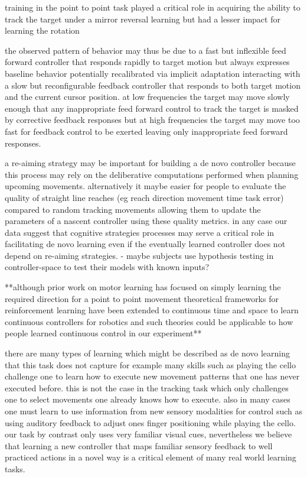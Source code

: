 \documentclass[../main.tex]{subfiles}
\begin{document}
{{training in the point to point task played a critical role in acquiring the ability to track the target under a mirror reversal learning but had a lesser impact for learning the rotation

the observed pattern of behavior may thus be due to a fast but inflexible feed forward controller that responds rapidly to target motion but always expresses baseline behavior potentially recalibrated via implicit adaptation interacting with a slow but reconfigurable feedback controller that responds to both target motion and the current cursor position. at low frequencies the target may move slowly enough that any inappropriate feed forward control to track the target is masked by corrective feedback responses but at high frequencies the target may move too fast for feedback control to be exerted leaving only inappropriate feed forward responses.

a re-aiming strategy may be important for building a de novo controller because this process may rely on the deliberative computations performed when planning upcoming movements. alternatively it maybe easier for people to evaluate the quality of straight line reaches (eg reach direction movement time task error) compared to random tracking movements allowing them to update the parameters of a nascent controller using these quality metrics. in any case our data suggest that cognitive strategies processes may serve a critical role in facilitating de novo learning even if the eventually learned controller does not depend on re-aiming strategies.
	- maybe subjects use hypothesis testing in controller-space to test their models with known inputs?

**although prior work on motor learning has focused on simply learning the required direction for a point to point movement theoretical frameworks for reinforcement learning have been extended to continuous time and space to learn continuous controllers for robotics and such theories could be applicable to how people learned continuous control in our experiment**

there are many types of learning which might be described as de novo learning that this task does not capture for example many skills such as playing the cello challenge one to learn how to execute new movement patterns that one has never executed before. this is not the case in the tracking task which only challenges one to select movements one already knows how to execute. also in many cases one must learn to use information from new sensory modalities for control such as using auditory feedback to adjust ones finger positioning while playing the cello. our task by contrast only uses very familiar visual cues, nevertheless we believe that learning a new controller that maps familiar sensory feedback to well practiced actions in a novel way is a critical element of many real world learning tasks.

}}
\end{document}
